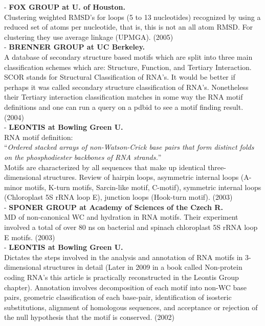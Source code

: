 - \textbf{FOX GROUP at U. of Houston.}\\
Clustering weighted RMSD's  for loops (5 to 13 nucleotides) recognized
by using a reduced set of atoms per nucleotide, that is, this is not
an all atom RMSD. For clustering they use average linkage
(UPMGA). (2005)
\cite{huang2005}\\

- \textbf{BRENNER GROUP at UC Berkeley.}\\
A database of secondary structure based motifs which are split into
three main classification schemes which are: Structure, Function, and
Tertiary Interaction. SCOR stands for Structural Classification of
RNA's. It would be better if perhaps it was called secondary
structure classification of RNA's. Nonetheless their Tertiary
interaction classification matches in some way the RNA motif
definitions and one can run a query on a pdbid to see a motif finding
result. (2004)
\cite{klosterman2004}\\

- \textbf{LEONTIS at Bowling Green U.}\\
RNA motif definition:\\
``\textit{Ordered stacked arrays of non-Watson-Crick  base  pairs  that  form
distinct  folds  on  the phosphodiester  backbones of  RNA strands.}''\\
Motifs  are characterized  by  all sequences  that  make up  identical
three-dimensional structures.  Review  of hairpin
loops,  asymmetric  internal  loops  (A-minor motifs,  K-turn  motifs,
Sarcin-like motif, C-motif),  symmetric internal loops (Chloroplast 5S
rRNA loop E), junction loops (Hook-turn motif). (2003)
\cite{leontis2003}\\

- \textbf{SPONER GROUP at Academy of Sciences of the Czech R.}\\
MD of non-canonical WC and hydration in RNA  motifs. Their experiment
involved a total
of over  80 ns on  bacterial and spinach  chloroplast 5S rRNA  loop E
motifs. (2003)
\cite{reblova2003}\\

- \textbf{LEONTIS at Bowling Green U.}\\
Dictates the  steps involved  in the analysis  and annotation  of RNA
motifs in 3-dimensional  structures in detail (Later in 2009 in a book
called Non-protein coding RNA's this article is practically
reconstructed in the Leontis Group chapter). Annotation involves
decomposition
of each motif into non-WC base pairs, geometric classification of each
base-pair,  identification  of  isosteric substitutions,  alignment  of
homologous  sequences,  and  acceptance   or  rejection  of  the  null
hypothesis that the motif is conserved. (2002)
\cite{leontis2002b}\\


